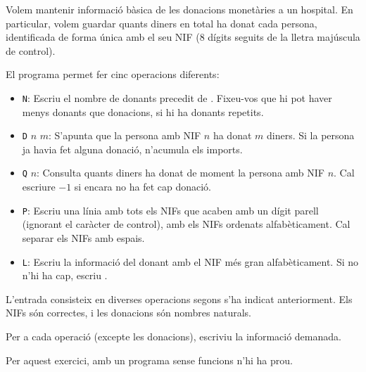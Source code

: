 

\Statement

Volem mantenir informació bàsica de les donacions monetàries a un hospital.
En particular, volem guardar quants diners en total ha donat cada persona,
identificada de forma única amb el seu NIF (8 dígits seguits de la lletra majúscula de control).

\medskip

El programa permet fer cinc operacions diferents:
\begin{itemize}
\item
\texttt{N}:
Escriu el nombre de donants precedit de .
Fixeu-vos que hi pot haver menys donants que donacions,
si hi ha donants repetits.
\item
\texttt{D} $n$ $m$:
S'apunta que la persona amb NIF $n$ ha donat $m$ diners.
Si la persona ja havia fet alguna donació, n'acumula els imports.
\item
\texttt{Q} $n$:
Consulta quants diners ha donat de moment la persona amb NIF $n$.
Cal escriure $-1$ si encara no ha fet cap donació.
\item
\texttt{P}:
Escriu una línia amb tots els NIFs que acaben amb un dígit parell
(ignorant el caràcter de control),
amb els NIFs ordenats alfabèticament.
Cal separar els NIFs amb espais.
\item
\texttt{L}:
Escriu la informació del donant amb el NIF més gran alfabèticament.
Si no n'hi ha cap, escriu .
\end{itemize}


\Input

L'entrada consisteix en diverses operacions segons s'ha indicat anteriorment.
Els NIFs són correctes, i les donacions són nombres naturals.


\Output

Per a cada operació (excepte les donacions),
escriviu la informació demanada.

\Observations

Per aquest exercici, amb un programa sense funcions n'hi ha prou.


\Sample

